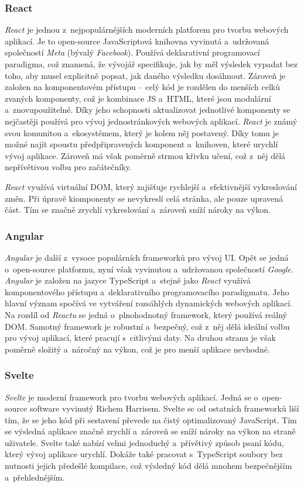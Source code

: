 \subsubsection*{React}
\textit{React} je jednou z~nejpopulárnějších moderních platforem pro tvorbu webových aplikací. Je to open-source JavaScriptová knihovna vyvinutá a~udržovaná společností \textit{Meta} (bývalý \textit{Facebook}). Používá deklarativní programovací paradigma, což znamená, že vývojář specifikuje, jak by měl výsledek vypadat bez toho, aby musel explicitně popsat, jak daného výsledku dosáhnout. Zároveň je založen na komponentovém přístupu -- celý kód je rozdělen do menších celků zvaných komponenty, což je kombinace JS a~HTML, které jsou modulární a~znovupoužitelné. Díky jeho schopnosti aktualizovat jednotlivé komponenty se nejčastěji používá pro vývoj jednostránkových webových aplikací. \textit{React} je známý svou komunitou a~ekosystémem, který je kolem něj postavený. Díky tomu je možné najít spoustu předpřipravených komponent a~knihoven, které urychlí vývoj aplikace. Zároveň má však poměrně strmou křivku učení, což z~něj dělá nepřívětivou volbu pro začátečníky.

\textit{React} využívá virtuální DOM, který zajišťuje rychlejší a~efektivnější vykreslování změn. Při úpravě kiomponenty se nevykreslí celá stránka, ale pouze upravená část. Tím se značně zrychlí vykreslování a~zároveň sníží nároky na výkon. \cite{react, what_react_is_and_why_it_matters,angular_vs_react}

\subsubsection*{Angular}
\textit{Angular} je další z~vysoce populárních frameworků pro vývoj UI. Opět se jedná o~open-source platformu, nyní však vyvinutou a~udržovanou společností \textit{Google}. \textit{Angular} je založen na jazyce TypeScript a~stejně jako \textit{React} využívá komponentového přístupu a~deklarativního programovacího paradigmatu. Jeho hlavní význam spočívá ve vytváření rozsáhlých dynamických webových aplikací. Na rozdíl od \textit{Reactu} se jedná o~plnohodnotný framework, který používá reálný DOM. Samotný framework je robustní a~bezpečný, což z~něj dělá ideální volbu pro vývoj aplikací, které pracují s~citlivými daty. Na druhou stranu je však poměrně složitý a~náročný na výkon, což je pro menší aplikace nevhodné. \cite{angular_vs_react, what_is_angular}

\subsubsection*{Svelte}
\textit{Svelte} je moderní framework pro tvorbu webových aplikací. Jedná se o~open-source software vyvinutý Richem Harrisem. Svelte se od ostatních frameworků liší tím, že se jeho kód při sestavení převede na čistý optimalizovaný JavaScript. Tím se výsledná aplikace značně zrychlí a~zároveň se sníží nároky na výkon na straně uživatele. Svelte také nabízí velmi jednoduchý a~přívětivý způsob psaní kódu, který vývoj aplikace urychlí. Dokáže také pracovat s~TypeScript soubory bez nutnosti jejich předešlé kompilace, což výsledný kód dělá mnohem bezpečnějším a~přehlednějším. \cite{svelte_and_why_you_should_consider_it,svelte}

